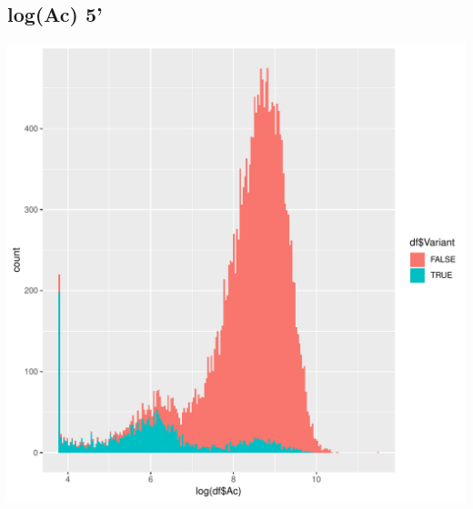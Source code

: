 \documentclass{article}\usepackage[]{graphicx}\usepackage[]{color}
\newenvironment{knitrout}{}{} %
\begin{document}
\subsection{log(Ac) 5'}
\begin{knitrout}
\color{fgcolor}

{\centering \includegraphics[width=1\linewidth]{figure/minimal-dens_5-1} 

}



\end{knitrout}
\clearpage
\end{document}
